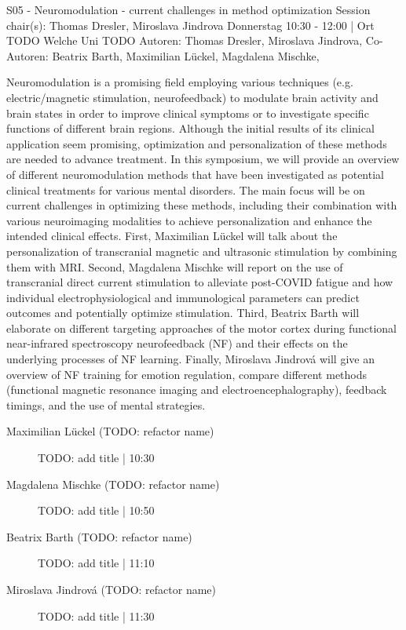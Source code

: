 
            \begin{symposium}
            {S05 - Neuromodulation - current challenges in method optimization}
            {Session chair(s): Thomas Dresler, Miroslava Jindrova}
            {Donnerstag 10:30 - 12:00 | Ort TODO}
            {Welche Uni TODO}
            Autoren: Thomas Dresler, Miroslava Jindrova, Co-Autoren: Beatrix Barth, Maximilian Lückel, Magdalena Mischke, 

Neuromodulation is a promising field employing various techniques (e.g. electric/magnetic stimulation, neurofeedback) to modulate brain activity and brain states in order to improve clinical symptoms or to investigate specific functions of different brain regions. Although the initial results of its clinical application seem promising, optimization and personalization of these methods are needed to advance treatment. In this symposium, we will provide an overview of different neuromodulation methods that have been investigated as potential clinical treatments for various mental disorders. The main focus will be on current challenges in optimizing these methods, including their combination with various neuroimaging modalities to achieve personalization and enhance the intended clinical effects. First, Maximilian Lückel will talk about the personalization of transcranial magnetic and ultrasonic stimulation by combining them with MRI. Second, Magdalena Mischke will report on the use of transcranial direct current stimulation to alleviate post-COVID fatigue and how individual electrophysiological and immunological parameters can predict outcomes and potentially optimize stimulation. Third, Beatrix Barth will elaborate on different targeting approaches of the motor cortex during functional near-infrared spectroscopy neurofeedback (NF) and their effects on the underlying processes of NF learning. Finally, Miroslava Jindrová will give an overview of NF training for emotion regulation, compare different methods (functional magnetic resonance imaging and electroencephalography), feedback timings, and the use of mental strategies.
            \begin{description}    
            
                \item [Maximilian Lückel (TODO: refactor name)] TODO: add title \textcolor{mygray}{ | 10:30}    
                
                \item [Magdalena Mischke (TODO: refactor name)] TODO: add title \textcolor{mygray}{ | 10:50}    
                
                \item [Beatrix Barth (TODO: refactor name)] TODO: add title \textcolor{mygray}{ | 11:10}    
                
                \item [Miroslava Jindrová (TODO: refactor name)] TODO: add title \textcolor{mygray}{ | 11:30}    
                
            \end{description} 
            \end{symposium}
            